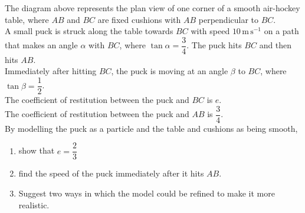 \documentclass[leqno]{article}
\begin{document}
\begin{enumerate}[
  label=\textbf{\arabic*.},
  leftmargin=*,
  topsep=0pt,
  partopsep=0pt,
  parsep=0pt
]
\begin{figure}[H]
\end{figure}


The diagram above represents the plan view of one corner of a smooth air-hockey table, where $AB$ and $BC$ are fixed cushions with $AB$ perpendicular to $BC$. \\

A small puck is struck along the table towards $BC$ with speed $10\,\mathrm{m\,s^{-1}}$ on a path that makes an angle $\alpha$ with $BC$, where $\tan \alpha = \dfrac{3}{4}$. The puck hits $BC$ and then hits $AB$. \\

Immediately after hitting $BC$, the puck is moving at an angle $\beta$ to $BC$, where $\tan \beta = \dfrac{1}{2}$. \\

The coefficient of restitution between the puck and $BC$ is $e$. \\

The coefficient of restitution between the puck and $AB$ is $\dfrac{3}{4}$. \\

By modelling the puck as a particle and the table and cushions as being smooth, \\

\begin{enumerate}[label=\textbf{(\alph*)}]
  \item show that $e = \dfrac{2}{3}$  \\
  \item find the speed of the puck immediately after it hits $AB$.  \\
  \item Suggest two ways in which the model could be refined to make it more realistic.  \\
\end{enumerate}


\end{enumerate}
\end{document}
